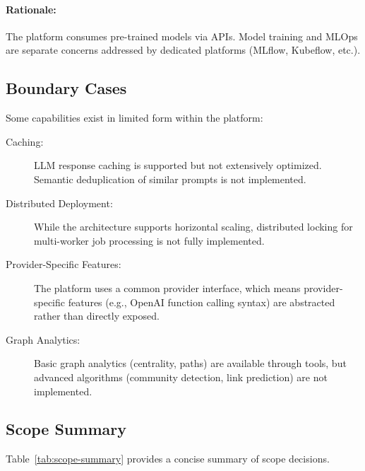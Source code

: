 \paragraph{Rationale:} The platform consumes pre-trained models via APIs. Model training and MLOps are separate concerns addressed by dedicated platforms (MLflow, Kubeflow, etc.).

\subsection{Boundary Cases}

Some capabilities exist in limited form within the platform:

\begin{description}
    \item[Caching:] LLM response caching is supported but not extensively optimized. Semantic deduplication of similar prompts is not implemented.
    
    \item[Distributed Deployment:] While the architecture supports horizontal scaling, distributed locking for multi-worker job processing is not fully implemented.
    
    \item[Provider-Specific Features:] The platform uses a common provider interface, which means provider-specific features (e.g., OpenAI function calling syntax) are abstracted rather than directly exposed.
    
    \item[Graph Analytics:] Basic graph analytics (centrality, paths) are available through tools, but advanced algorithms (community detection, link prediction) are not implemented.
\end{description}

\subsection{Scope Summary}

Table~\ref{tab:scope-summary} provides a concise summary of scope decisions.

